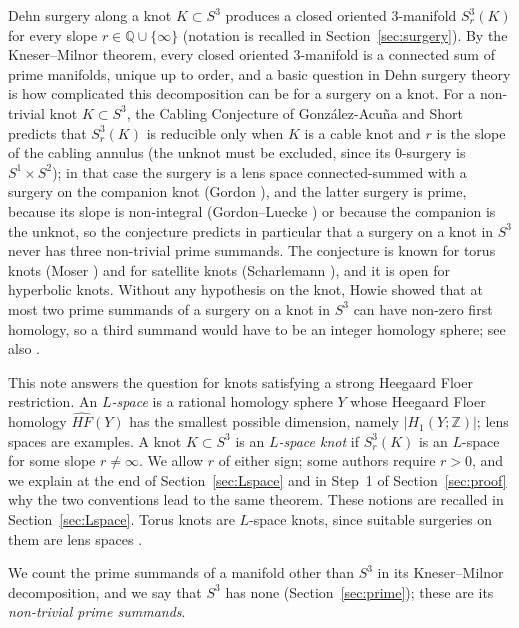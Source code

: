 \documentclass[11pt]{article}
\newcommand{\Z}{\mathbb Z}
\newcommand{\Q}{\mathbb Q}
\newcommand{\Surg}[2]{S^3_{#1}(#2)}
\newcommand{\HFhat}{\widehat{HF}}
\theoremstyle{definition}
\theoremstyle{remark}
\begin{document}
Dehn surgery along a knot \(K\subset S^3\) produces a closed oriented
\(3\)-manifold \(\Surg{r}{K}\) for every slope
\(r\in\Q\cup\{\infty\}\) (notation is recalled in
Section~\ref{sec:surgery}). By the Kneser--Milnor theorem, every closed
oriented \(3\)-manifold is a connected sum of prime manifolds, unique up to
order, and a basic question in Dehn surgery theory is how complicated this
decomposition can be for a surgery on a knot. For a non-trivial knot
\(K\subset S^3\), the Cabling Conjecture of Gonz\'alez-Acu\~na and Short
\cite{GAS1986} predicts that \(\Surg{r}{K}\) is reducible only when
\(K\) is a cable knot and \(r\) is the slope of the cabling annulus (the
unknot must be excluded, since its \(0\)-surgery is \(S^1\times S^2\)); in
that case the surgery is a lens space connected-summed
with a surgery on the companion knot (Gordon \cite{Gordon1983}), and the
latter surgery is prime, because its slope is non-integral (Gordon--Luecke
\cite{GordonLuecke1987}) or because the companion is the unknot, so the
conjecture predicts in particular that a
surgery on a knot in \(S^3\) never has three non-trivial prime summands.
The conjecture is known for
torus knots (Moser \cite{Moser1971}) and for satellite knots (Scharlemann
\cite{Scharlemann1990}), and it is open for hyperbolic knots. Without any
hypothesis on the knot, Howie \cite{Howie2002} showed that at most two
prime summands of a surgery on a knot in \(S^3\) can have non-zero first
homology, so a third summand would have to be an integer homology sphere;
see also \cite{Howie2010}.

This note answers the question for knots satisfying a strong
Heegaard Floer restriction. An \emph{\(L\)-space} is a rational homology
sphere \(Y\) whose Heegaard Floer homology \(\HFhat(Y)\) has the smallest
possible dimension, namely \(|H_1(Y;\Z)|\); lens spaces are examples. A knot
\(K\subset S^3\) is an \emph{\(L\)-space knot} if \(\Surg{r}{K}\) is an
\(L\)-space for some slope \(r\neq\infty\). We allow \(r\) of either sign;
some authors require \(r>0\), and we explain at the end of
Section~\ref{sec:Lspace} and in Step~1 of Section~\ref{sec:proof} why the
two conventions lead to the same theorem. These notions are recalled in
Section~\ref{sec:Lspace}. Torus knots are \(L\)-space knots, since
suitable surgeries on them are lens spaces \cite{Moser1971}.

We count the prime summands of a manifold other than \(S^3\) in its
Kneser--Milnor decomposition, and we say that \(S^3\) has none
(Section~\ref{sec:prime}); these are its \emph{non-trivial prime
summands}.
\end{document}
